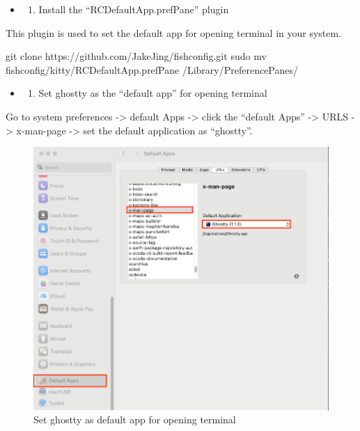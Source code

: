 \documentclass[
  letterpaper,
  DIV=11,
  numbers=noendperiod]{scrartcl}
\newenvironment{Shaded}{}{}
\newcommand{\FunctionTok}[1]{\textcolor[rgb]{0.25,0.47,0.95}{#1}}
\newcommand{\NormalTok}[1]{\textcolor[rgb]{0.22,0.23,0.26}{#1}}
\providecommand{\tightlist}{%
  \setlength{\itemsep}{0pt}\setlength{\parskip}{0pt}}\usepackage{longtable,booktabs,array}
\begin{document}
\begin{itemize}
\tightlist
\item
  \begin{enumerate}
  \def\labelenumi{(\arabic{enumi})}
  \tightlist
  \item
    Install the ``RCDefaultApp.prefPane'' plugin
  \end{enumerate}
\end{itemize}

This plugin is used to set the default app for opening terminal in your
system.

\begin{Shaded}
\begin{Highlighting}[]
\FunctionTok{git}\NormalTok{ clone https://github.com/JakeJing/fishconfig.git}
\FunctionTok{sudo}\NormalTok{ mv fishconfig/kitty/RCDefaultApp.prefPane /Library/PreferencePanes/}
\end{Highlighting}
\end{Shaded}

\begin{itemize}
\tightlist
\item
  \begin{enumerate}
  \def\labelenumi{(\arabic{enumi})}
  \setcounter{enumi}{1}
  \tightlist
  \item
    Set ghostty as the ``default app'' for opening terminal
  \end{enumerate}
\end{itemize}

Go to system preferences -\textgreater{} default Apps -\textgreater{}
click the ``default Apps'' -\textgreater{} URLS -\textgreater{}
x-man-page -\textgreater{} set the default application as ``ghostty''.

\begin{figure}[H]

{\centering \includegraphics{./images/ghostty-default.png}

}

\caption{Set ghostty as default app for opening terminal}

\end{figure}%
\end{document}
